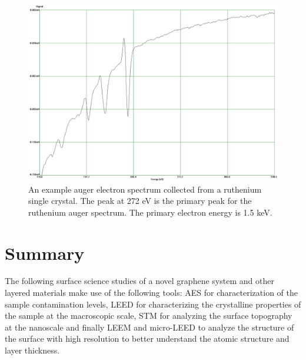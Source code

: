 \begin{figure}
\includegraphics[scale=0.42]{figs/auger-ru.png}
\caption{
An example auger electron spectrum collected from a ruthenium single crystal. The peak at 272 eV is the primary peak for the ruthenium auger spectrum. The primary electron energy is 1.5 keV.
}
\label{fig:auger-ru}
\end{figure}

\section{Summary}
The following surface science studies of a novel graphene system and other layered materials make use of the following tools: AES for characterization of the sample contamination levels, LEED for characterizing the crystalline properties of the sample at the macroscopic scale, STM for analyzing the surface topography at the nanoscale and finally LEEM and micro-LEED to analyze the structure of the surface with high resolution to better understand the atomic structure and layer thickness.

